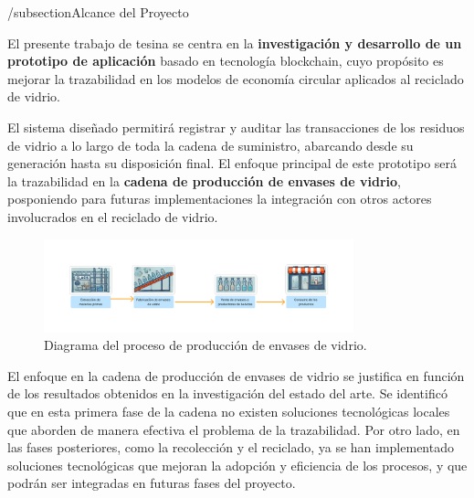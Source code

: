 \documentclass[main.tex]{subfiles}
\begin{document}
/subsection{Alcance del Proyecto}

El presente trabajo de tesina se centra en la \textbf{investigación y desarrollo de un prototipo de aplicación} basado en tecnología blockchain, cuyo propósito es mejorar la trazabilidad en los modelos de economía circular aplicados al reciclado de vidrio. 

El sistema diseñado permitirá registrar y auditar las transacciones de los residuos de vidrio a lo largo de toda la cadena de suministro, abarcando desde su generación hasta su disposición final. El enfoque principal de este prototipo será la trazabilidad en la \textbf{cadena de producción de envases de vidrio}, posponiendo para futuras implementaciones la integración con otros actores involucrados en el reciclado de vidrio.

\begin{figure}[h]
    \centering
    \includegraphics[width=0.8\textwidth]{./assets/glass-production.png}
    \caption{Diagrama del proceso de producción de envases de vidrio.}
    \label{fig:glass_production}
\end{figure}

El enfoque en la cadena de producción de envases de vidrio se justifica en función de los resultados obtenidos en la investigación del estado del arte. Se identificó que en esta primera fase de la cadena no existen soluciones tecnológicas locales que aborden de manera efectiva el problema de la trazabilidad. Por otro lado, en las fases posteriores, como la recolección y el reciclado, ya se han implementado soluciones tecnológicas que mejoran la adopción y eficiencia de los procesos, y que podrán ser integradas en futuras fases del proyecto.


\end{document}
